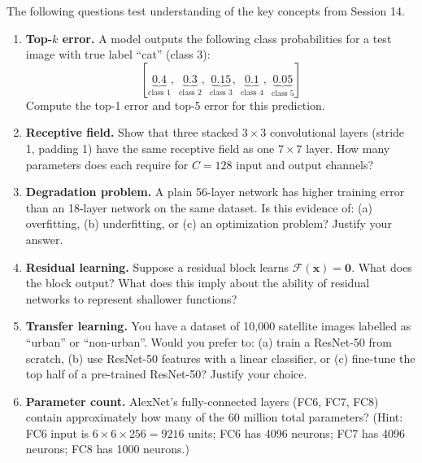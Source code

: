 \documentclass[12pt,a4paper]{article}
\begin{document}
The following questions test understanding of the key concepts from Session 14.

\begin{enumerate}[leftmargin=2em, label=\textbf{Q\arabic*.}]

  \item \textbf{Top-$k$ error.}
  A model outputs the following class probabilities for a test image with true label ``cat'' (class 3):
  \[
    [\underbrace{0.4}_{\text{class 1}},\; \underbrace{0.3}_{\text{class 2}},\;
     \underbrace{0.15}_{\text{class 3}},\; \underbrace{0.1}_{\text{class 4}},\;
     \underbrace{0.05}_{\text{class 5}}]
  \]
  Compute the top-1 error and top-5 error for this prediction.

  \item \textbf{Receptive field.}
  Show that three stacked $3\times3$ convolutional layers (stride 1, padding 1) have the same receptive field as one $7\times7$ layer. How many parameters does each require for $C=128$ input and output channels?

  \item \textbf{Degradation problem.}
  A plain 56-layer network has higher training error than an 18-layer network on the same dataset. Is this evidence of: (a) overfitting, (b) underfitting, or (c) an optimization problem? Justify your answer.

  \item \textbf{Residual learning.}
  Suppose a residual block learns $\mathcal{F}(\mathbf{x}) = \mathbf{0}$. What does the block output? What does this imply about the ability of residual networks to represent shallower functions?

  \item \textbf{Transfer learning.}
  You have a dataset of 10,000 satellite images labelled as ``urban'' or ``non-urban''. Would you prefer to: (a) train a ResNet-50 from scratch, (b) use ResNet-50 features with a linear classifier, or (c) fine-tune the top half of a pre-trained ResNet-50? Justify your choice.

  \item \textbf{Parameter count.}
  AlexNet's fully-connected layers (FC6, FC7, FC8) contain approximately how many of the 60 million total parameters? (Hint: FC6 input is $6\times6\times256=9216$ units; FC6 has 4096 neurons; FC7 has 4096 neurons; FC8 has 1000 neurons.)

\end{enumerate}

\end{document}
